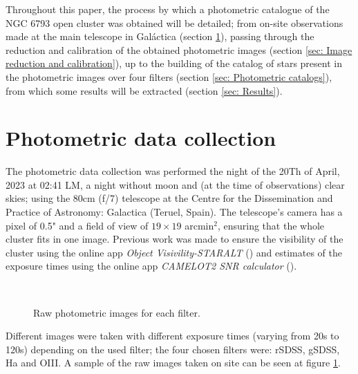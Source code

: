 \documentclass{aa}
\begin{document}
    Throughout this paper, the process by which a photometric catalogue of the NGC 6793 open cluster was obtained will be detailed; from on-site observations made at the main telescope in Galáctica (section \ref{sec: Photometric data collection}), passing through the reduction and calibration of the obtained photometric images (section \ref{sec: Image reduction and calibration}), up to the building of the catalog of stars present in the photometric images over four filters (section \ref{sec: Photometric catalogs}), from which some results will be extracted (section \ref{sec: Results}).
    \section{Photometric data collection}\label{sec: Photometric data collection}
    The photometric data collection was performed the night of the 20Th of April, 2023 at 02:41 LM, a night without moon and (at the time of observations) clear skies; using the 80cm (f/7) telescope at the Centre for the Dissemination and Practice of Astronomy: Galactica (Teruel, Spain). The telescope's  camera has a pixel of 0.5" and a field of view of $19\times19$ arcmin$^2$, ensuring that the whole cluster fits in one image. Previous work was made to ensure the visibility of the cluster using the online app \textit{Object Visivility-STARALT} (\cite{STARALT}) and estimates of the exposure times using the online app \textit{CAMELOT2 SNR calculator} (\cite{EXP_Calculator}).
    \begin{figure}[H]
      \centering
      \quad
      \\
      \quad
      \caption{Raw photometric images for each filter.}
      \label{fig: Raw  Images}
    \end{figure}
    Different images were taken with different exposure times (varying from 20s to 120s) depending on the used filter; the four chosen filters were: rSDSS, gSDSS, Ha and OIII. A sample of the raw images taken on site can be seen at figure \ref{fig: Raw  Images}.
\end{document}
